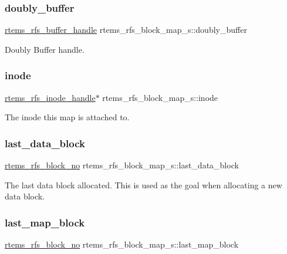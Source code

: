 \subsubsection{\texorpdfstring{doubly\_buffer}{doubly\_buffer}}
{\footnotesize\ttfamily \mbox{\hyperlink{rtems-rfs-buffer_8h_a17f97c37c5273ad28d413dfd2d175e23}{rtems\+\_\+rfs\+\_\+buffer\+\_\+handle}} rtems\+\_\+rfs\+\_\+block\+\_\+map\+\_\+s\+::doubly\+\_\+buffer}

Doubly Buffer handle. \mbox{\label{structrtems__rfs__block__map__s_a74f7b66eec17822aa175f0c19d61c28a}} 
\subsubsection{\texorpdfstring{inode}{inode}}
{\footnotesize\ttfamily \mbox{\hyperlink{rtems-rfs-inode_8h_a91f02dac5a2d91e072d676f3266ab8d2}{rtems\+\_\+rfs\+\_\+inode\+\_\+handle}}$\ast$ rtems\+\_\+rfs\+\_\+block\+\_\+map\+\_\+s\+::inode}

The inode this map is attached to. \mbox{\label{structrtems__rfs__block__map__s_ac8e110de9402ef2f75263c6a4244a5d8}} 
\subsubsection{\texorpdfstring{last\_data\_block}{last\_data\_block}}
{\footnotesize\ttfamily \mbox{\hyperlink{rtems-rfs-block-pos_8h_abbf8bb95acf9bd16ed3291f7da518e9a}{rtems\+\_\+rfs\+\_\+block\+\_\+no}} rtems\+\_\+rfs\+\_\+block\+\_\+map\+\_\+s\+::last\+\_\+data\+\_\+block}

The last data block allocated. This is used as the goal when allocating a new data block. \mbox{\label{structrtems__rfs__block__map__s_a982fb2a5ea76eb2dbb21dd76dca259e3}} 
\subsubsection{\texorpdfstring{last\_map\_block}{last\_map\_block}}
{\footnotesize\ttfamily \mbox{\hyperlink{rtems-rfs-block-pos_8h_abbf8bb95acf9bd16ed3291f7da518e9a}{rtems\+\_\+rfs\+\_\+block\+\_\+no}} rtems\+\_\+rfs\+\_\+block\+\_\+map\+\_\+s\+::last\+\_\+map\+\_\+block}

